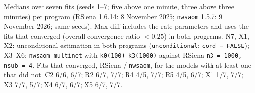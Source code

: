 {\par\smallskip\footnotesize Medians over seven fits (seeds 1--7; five above one minute, three above three minutes) per program (RSiena 1.6.14: 8 November 2026; \texttt{nwsaom} 1.5.7: 9 November 2026; same seeds). Max diff includes the rate parameters and uses the fits that converged (overall convergence ratio $<0.25$) in both programs. N7, X1, X2: unconditional estimation in both programs (\texttt{unconditional}; \texttt{cond = FALSE}); X3--X6: \texttt{nwsaom multinet} with \texttt{k0(100) k3(1000)} against RSiena \texttt{n3 = 1000, nsub = 4}. Fits that converged, RSiena / \texttt{nwsaom}, for the models with at least one that did not: C2 6/6, 6/7; R2 6/7, 7/7; R4 4/5, 7/7; R5 4/5, 6/7; X1 1/7, 7/7; X3 7/7, 5/7; X4 6/7, 6/7; X5 6/7, 7/7.\par}
